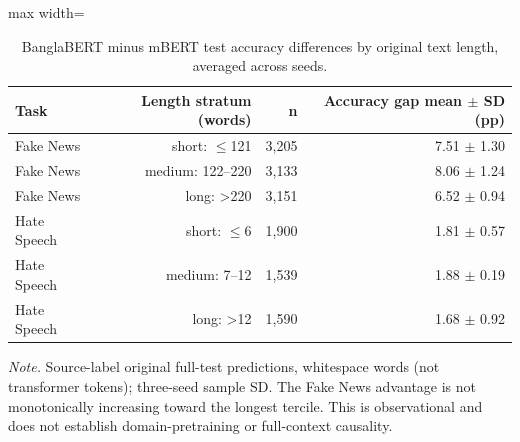 \begin{table}[t]
\centering
\caption{BanglaBERT minus mBERT test accuracy differences by original text length, averaged across seeds.}
\label{tab:length}
\footnotesize
\begin{adjustbox}{max width=\linewidth}
\begin{tabular}{lrrr}
\toprule
Task & Length stratum (words) & n & Accuracy gap mean $\pm$ SD (pp) \\
\midrule
Fake News & short: $\leq$121 & 3,205 & 7.51 $\pm$ 1.30 \\
Fake News & medium: 122--220 & 3,133 & 8.06 $\pm$ 1.24 \\
Fake News & long: \textgreater{}220 & 3,151 & 6.52 $\pm$ 0.94 \\
Hate Speech & short: $\leq$6 & 1,900 & 1.81 $\pm$ 0.57 \\
Hate Speech & medium: 7--12 & 1,539 & 1.88 $\pm$ 0.19 \\
Hate Speech & long: \textgreater{}12 & 1,590 & 1.68 $\pm$ 0.92 \\
\bottomrule
\end{tabular}
\end{adjustbox}
\par\vspace{2pt}
\begin{minipage}{\linewidth}
\scriptsize\emph{Note.} Source-label original full-test predictions, whitespace words (not transformer tokens); three-seed sample SD. The Fake News advantage is not monotonically increasing toward the longest tercile. This is observational and does not establish domain-pretraining or full-context causality.
\end{minipage}
\end{table}

